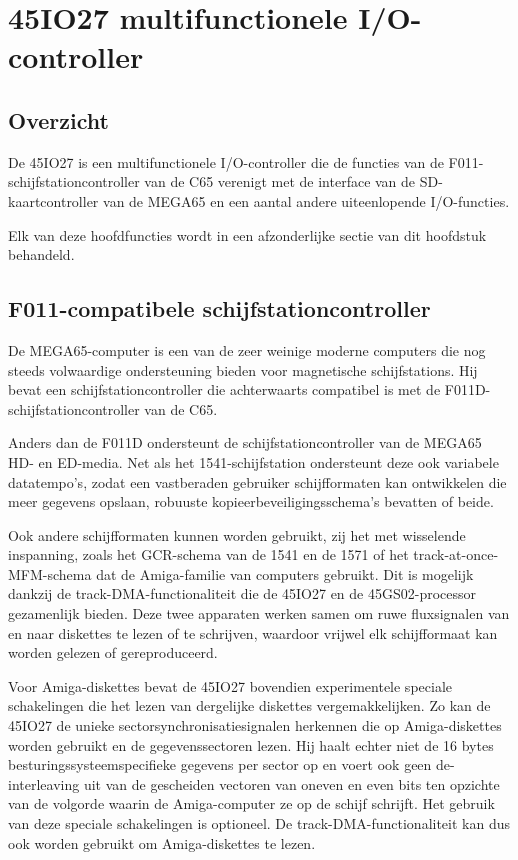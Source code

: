 \chapter{45IO27 multifunctionele I/O-controller}

\section{Overzicht}

De 45IO27 is een multifunctionele I/O-controller die de functies van de F011-schijfstationcontroller van de C65 verenigt met de interface van de SD-kaartcontroller van de MEGA65 en een aantal andere uiteenlopende I/O-functies.

Elk van deze hoofdfuncties wordt in een afzonderlijke sectie van dit hoofdstuk behandeld.

\section{F011-compatibele schijfstationcontroller}

De MEGA65-computer is een van de zeer weinige moderne computers die nog steeds volwaardige ondersteuning bieden voor magnetische schijfstations. Hij bevat een schijfstationcontroller die achterwaarts compatibel is met de F011D-schijfstationcontroller van de C65.

Anders dan de F011D ondersteunt de schijfstationcontroller van de MEGA65 HD- en ED-media. Net als het 1541-schijfstation ondersteunt deze ook variabele datatempo's, zodat een vastberaden gebruiker schijfformaten kan ontwikkelen die meer gegevens opslaan, robuuste kopieerbeveiligingsschema's bevatten of beide.

Ook andere schijfformaten kunnen worden gebruikt, zij het met wisselende inspanning, zoals het GCR-schema van de 1541 en de 1571 of het track-at-once-MFM-schema dat de Amiga\texttrademark{}-familie van computers gebruikt. Dit is mogelijk dankzij de track-DMA-functionaliteit die de 45IO27 en de 45GS02-processor gezamenlijk bieden. Deze twee apparaten werken samen om ruwe fluxsignalen van en naar diskettes te lezen of te schrijven, waardoor vrijwel elk schijfformaat kan worden gelezen of gereproduceerd.

Voor Amiga\texttrademark{}-diskettes bevat de 45IO27 bovendien experimentele speciale schakelingen die het lezen van dergelijke diskettes vergemakkelijken. Zo kan de 45IO27 de unieke sectorsynchronisatiesignalen herkennen die op Amiga\texttrademark{}-diskettes worden gebruikt en de gegevenssectoren lezen. Hij haalt echter niet de 16 bytes besturingssysteemspecifieke gegevens per sector op en voert ook geen de-interleaving uit van de gescheiden vectoren van oneven en even bits ten opzichte van de volgorde waarin de Amiga\texttrademark{}-computer ze op de schijf schrijft. Het gebruik van deze speciale schakelingen is optioneel. De track-DMA-functionaliteit kan dus ook worden gebruikt om Amiga\texttrademark{}-diskettes te lezen.


